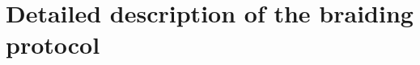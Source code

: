 \documentclass[12pt]{article}
\newenvironment{definition}[2][Definition]{\begin{trivlist}
\item[\hskip \labelsep {\bfseries #1}\hskip \labelsep {\bfseries #2.}]}{\end{trivlist}}
\begin{document}


\section*{Detailed description of the braiding protocol}
\end{document}
